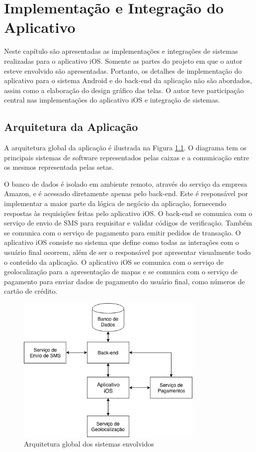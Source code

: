 \chapter{Implementação e Integração do Aplicativo} \label{cap:development}
Neste capítulo são apresentadas as implementações e integrações de sistemas realizadas para o aplicativo iOS. Somente as partes do projeto em que o autor esteve envolvido são apresentadas. Portanto, os detalhes de implementação do aplicativo para o sistema Android e do back-end da aplicação não são abordados, assim como a elaboração do design gráfico das telas. O autor teve participação central nas implementações do aplicativo iOS e integração de sistemas.

\section{Arquitetura da Aplicação}
A arquitetura global da aplicação é ilustrada na Figura \ref{fig:architecture}. O diagrama tem os principais sistemas de software representados pelas caixas e a comunicação entre os mesmos representada pelas setas. 

O banco de dados é isolado em ambiente remoto, através do serviço da empresa Amazon, e é acessado diretamente apenas pelo back-end. Este é responsável por implementar a maior parte da lógica de negócio da aplicação, fornecendo respostas às requisições feitas pelo aplicativo iOS. O back-end se comunica com o serviço de envio de SMS para requisitar e validar códigos de verificação. Também se comunica com o serviço de pagamento para emitir pedidos de transação. O aplicativo iOS consiste no sistema que define como todas as interações com o usuário final ocorrem, além de ser o responsável por apresentar visualmente todo o conteúdo da aplicação. O aplicativo iOS se comunica com o serviço de geolocalização para a apresentação de mapas e se comunica com o serviço de pagamento para enviar dados de pagamento do usuário final, como números de cartão de crédito.

\begin{figure}[H]
    \centering
    \includegraphics[width=0.8\textwidth]{pfc/figuras/system-architecture.png}
    \caption{Arquitetura global dos sistemas envolvidos}
    \label{fig:architecture}
\end{figure}


